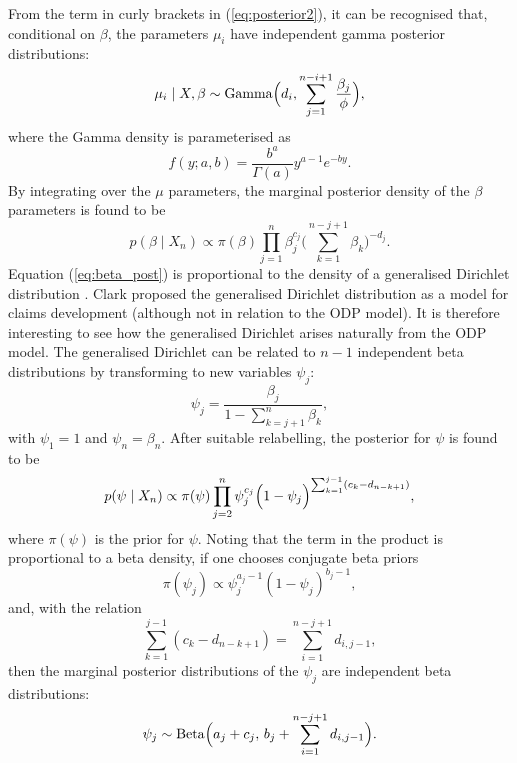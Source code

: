 \documentclass[aps,pre,draft]{revtex4-2}
\begin{document}
From the term in curly brackets in (\ref{eq:posterior2}), it can be recognised that, conditional on $\beta$, the parameters $\mu_i$ have independent gamma posterior distributions:
\begin{equation}\label{eq:gamma_post}
\mu_i\mid X,\beta\sim \operatorname{Gamma}\Bigl(d_i,\sum_{j=1}^{n-i+1}\frac{\beta_j}{\phi}\Bigr),
\end{equation}
where the Gamma density is parameterised as
\[
f(y;a,b)=\frac{b^a}{\Gamma(a)}y^{a-1}e^{-by}.
\]
By integrating over the $\mu$ parameters, the marginal posterior density of the $\beta$ parameters is found to be
\begin{equation}\label{eq:beta_post}
p(\beta\mid X_n)\propto\pi(\beta)\prod_{j=1}^{n}\beta_j^{c_j}\Biggl(\sum_{k=1}^{n-j+1}\beta_k\Biggr)^{-d_j}.
\end{equation}
Equation (\ref{eq:beta_post}) is proportional to the density of a generalised Dirichlet distribution \cite{chang2010structural}. Clark \cite{clark} proposed the generalised Dirichlet distribution as a model for claims development (although not in relation to the ODP model). 
It is therefore interesting to see how the generalised Dirichlet arises naturally from the ODP model. The generalised Dirichlet can be related to $n-1$ independent beta distributions by transforming to new variables $\psi_j$:
\begin{equation}\label{eq:psi}
\psi_j=\frac{\beta_j}{1-\sum_{k=j+1}^{n}\beta_k},
\end{equation}
with $\psi_1=1$ and $\psi_n=\beta_n$. After suitable relabelling, the posterior for $\psi$ is found to be
\begin{equation}\label{eq:psi_post}
p(\psi\mid X_n)\propto \pi(\psi)\prod_{j=2}^{n}\psi_j^{c_j}\Bigl(1-\psi_j\Bigr)^{\sum_{k=1}^{j-1}(c_k-d_{n-k+1})},
\end{equation}
where $\pi(\psi)$ is the prior for $\psi$. Noting that the term in the product is proportional to a beta density, if one chooses conjugate beta priors
\begin{equation}\label{eq:psi_prior}
\pi(\psi_j)\propto \psi_j^{a_j-1}(1-\psi_j)^{b_j-1},
\end{equation}
and, with the relation
\begin{equation}\label{eq:sum_relation}
\sum_{k=1}^{j-1}(c_k-d_{n-k+1})=\sum_{i=1}^{n-j+1}d_{i,j-1},
\end{equation}
then the marginal posterior distributions of the $\psi_j$ are independent beta distributions:
\begin{equation}\label{eq:psi_beta}
\psi_j\sim \operatorname{Beta}\Bigl(a_j+c_j,\,b_j+\sum_{i=1}^{n-j+1}d_{i,j-1}\Bigr).
\end{equation}
\end{document}
